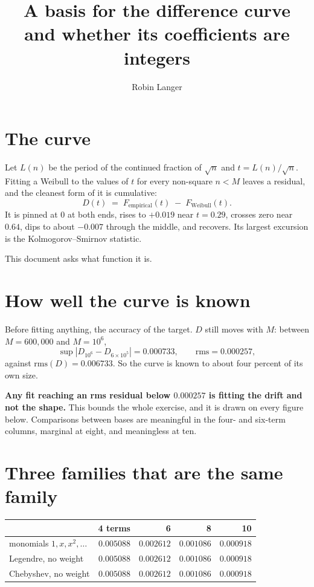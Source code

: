 \documentclass[12pt,a4paper]{article}
\title{A basis for the difference curve\\[0.4em]\large and whether its coefficients are integers}
\author{Robin Langer}
\date{}
\begin{document}
\maketitle
\vspace{-1.5em}

\section{The curve}

Let $L(n)$ be the period of the continued fraction of $\sqrt n$ and $t = L(n)/\sqrt n$. Fitting a Weibull to the values of $t$ for every non-square $n < M$ leaves a residual, and the cleanest form of it is cumulative:
\[
  D(t) \;=\; F_{\text{empirical}}(t) \;-\; F_{\text{Weibull}}(t) .
\]
It is pinned at $0$ at both ends, rises to $+0.019$ near $t = 0.29$, crosses zero near $0.64$, dips to about $-0.007$ through the middle, and recovers. Its largest excursion is the Kolmogorov--Smirnov statistic.

This document asks what function it is.

\section{How well the curve is known}

Before fitting anything, the accuracy of the target. $D$ still moves with $M$: between $M = 600{,}000$ and $M = 10^6$,
\[
  \sup|D_{10^6} - D_{6\times10^5}| = 0.000733,
  \qquad
  \mathrm{rms} = 0.000257 ,
\]
against $\mathrm{rms}(D) = 0.006733$. So the curve is known to about four percent of its own size.

\begin{tcolorbox}[colback=red!5, colframe=red!45!black, arc=2mm]
\textbf{Any fit reaching an rms residual below $0.000257$ is fitting the drift and not the shape.} This bounds the whole exercise, and it is drawn on every figure below. Comparisons between bases are meaningful in the four- and six-term columns, marginal at eight, and meaningless at ten.
\end{tcolorbox}

\section{Three families that are the same family}

\begin{center}
\begin{tabular}{lrrrr}
\toprule
 & 4 terms & 6 & 8 & 10 \\
\midrule
monomials $1,x,x^2,\ldots$ & $0.005088$ & $0.002612$ & $0.001086$ & $0.000918$ \\
Legendre, no weight        & $0.005088$ & $0.002612$ & $0.001086$ & $0.000918$ \\
Chebyshev, no weight       & $0.005088$ & $0.002612$ & $0.001086$ & $0.000918$ \\
\bottomrule
\end{tabular}
\end{center}
\end{document}
